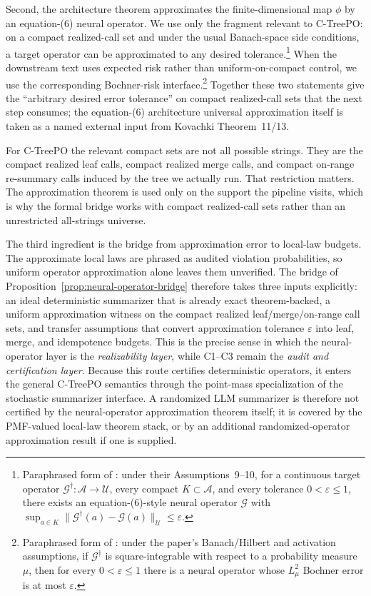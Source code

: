 Second, the architecture theorem approximates the finite-dimensional
map $\phi$ by an equation-(6) neural operator. We use only the
fragment relevant to C-TreePO: on a compact realized-call set and under
the usual Banach-space side conditions, a target operator can be
approximated to any desired tolerance.\footnote{Paraphrased
form of \citet[Theorem~11]{Kovachki23NeuralOperator}: under their
Assumptions~9--10, for a continuous target operator
$\mathcal{G}^\dagger:\mathcal{A}\to\mathcal{U}$, every compact
$K\subset\mathcal{A}$, and every tolerance $0<\varepsilon\le1$, there
exists an equation-(6)-style neural operator $\mathcal{G}$ with
$\sup_{a\in K}\|\mathcal{G}^\dagger(a)-\mathcal{G}(a)\|_{\mathcal{U}}
\le \varepsilon$.} When the downstream text uses expected risk rather
than uniform-on-compact control, we use the corresponding
Bochner-risk interface.\footnote{Paraphrased form of
\citet[Theorem~13]{Kovachki23NeuralOperator}: under the paper's
Banach/Hilbert and activation assumptions, if
$\mathcal{G}^\dagger$ is square-integrable with respect to a probability
measure $\mu$, then for every $0<\varepsilon\le1$ there is a neural
operator whose $L^2_{\mu}$ Bochner error is at most $\varepsilon$.}
Together these two statements give the ``arbitrary desired error
tolerance'' on compact realized-call sets that the next step consumes;
the equation-(6) architecture universal approximation itself is taken
as a named external input from Kovachki Theorem~11/13.

For C-TreePO the relevant compact sets are not all possible strings.
They are the compact realized leaf calls, compact realized merge calls,
and compact on-range re-summary calls induced by the tree we actually
run. That restriction matters. The approximation theorem is used only on
the support the pipeline visits, which is why the formal bridge works
with compact realized-call sets rather than an unrestricted all-strings
universe.

The third ingredient is the bridge from approximation error to local-law
budgets. The approximate local laws are phrased as audited violation
probabilities, so uniform operator approximation alone leaves them
unverified. The bridge of
Proposition~\ref{prop:neural-operator-bridge} therefore takes three
inputs explicitly: an ideal deterministic summarizer that is already
exact theorem-backed, a uniform approximation witness on the compact
realized leaf/merge/on-range call sets, and transfer assumptions that
convert approximation tolerance $\varepsilon$ into leaf, merge, and
idempotence budgets. This is the precise sense in which the
neural-operator layer is the \emph{realizability layer}, while C1--C3
remain the \emph{audit and certification layer}.
Because this route certifies deterministic operators, it enters the
general C-TreePO semantics through the point-mass specialization of the
stochastic summarizer interface. A randomized LLM summarizer is therefore
not certified by the neural-operator approximation theorem itself; it is
covered by the PMF-valued local-law theorem stack, or by an additional
randomized-operator approximation result if one is supplied.

